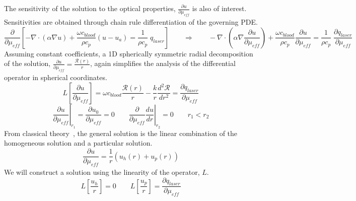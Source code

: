 \documentclass{article}         %
\theoremstyle{definition}
\theoremstyle{remark}
\begin{document}
The sensitivity of the solution to the optical properties, $\frac{\partial
u}{\partial \mu_\textit{eff}}$ is also of
interest.
Sensitivities are obtained through chain rule differentiation of the governing
PDE.
\[
\frac{\partial}{\partial \mu_\textit{eff}}
\left[
 -\nabla \cdot \left(   \alpha \nabla u  \right) 
 + \frac{\omega c_\textit{blood}}{\rho c_p} (u  - u_a )
 = \frac{1}{\rho c_p} \; q_{laser}
\right]
\qquad
\Rightarrow
\qquad
 -\nabla \cdot  \left(   \alpha \nabla  \frac{\partial u}{\partial \mu_\textit{eff}} \right) 
 + \frac{\omega c_\textit{blood}}{\rho c_p} \frac{\partial u}{\partial \mu_\textit{eff}}  
 = \frac{1}{\rho c_p} \;
   \frac{\partial q_{laser}}{\partial \mu_\textit{eff}}
\]
Assuming constant coefficients, 
a 1D spherically symmetric radial decomposition 
of the solution,
$ \frac{\partial u}{\partial \mu_\textit{eff}} = \frac{\mathcal{R}(r)}{r}$, again simplifies the analysis of the differential operator in
spherical coordinates.
\[
   L \left[\frac{\partial u}{\partial \mu_\textit{eff}}\right] = 
    \omega c_\textit{blood}  \frac{ \mathcal{R}(r)}{r} 
   -
    \frac{k }{r}   \frac{d^2 \mathcal{R}}{dr^2}
   = 
   \frac{\partial q_{laser}}{\partial \mu_\textit{eff}}
\]
\[
 \left.
 \frac{\partial u}{\partial \mu_\textit{eff}} 
  \right|_{r_1}
  = 
 \frac{\partial u_0}{\partial \mu_\textit{eff}} = 0
  \qquad
  \left. \frac{\partial }{\partial \mu_\textit{eff}}
   \frac{d u}{dr} \right|_{r_2}  = 0
  \qquad
   r_1 < r_2
\]
From classical theory~\cite{boyce1992elementary}, 
the general solution is the linear combination of the homogeneous solution and
a particular solution. 
\[
 \frac{\partial u}{\partial \mu_\textit{eff}} = 
  \frac{1}{r}
   \left(
  u_h(r)+ 
  u_p(r)
 \right)
\]
We will construct a solution using the linearity of the operator, $L$.
\[
  L \left[\frac{u_h}{r} \right] =  0 
  \qquad
  L \left[\frac{u_p}{r} \right] =  
   \frac{\partial q_{laser}}{\partial \mu_\textit{eff}}
\]
\end{document}
